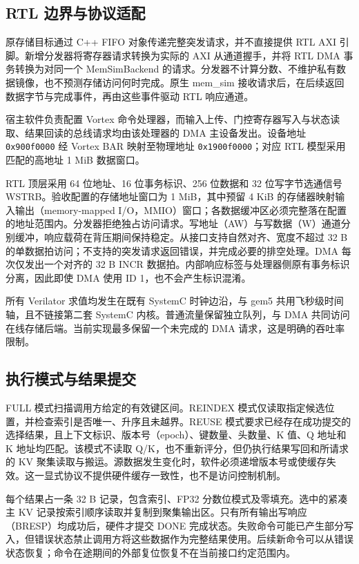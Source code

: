 \subsection{RTL 边界与协议适配}
原存储目标通过 C++ FIFO 对象传递完整突发请求，并不直接提供 RTL AXI 引脚。新增分发器将寄存器请求转换为实际的 AXI 从通道握手，并将 RTL DMA 事务转换为对同一个 MemSimBackend 的请求。分发器不计算分数、不维护私有数据镜像，也不预测存储访问何时完成。原生 mem\_sim 接收请求后，在后续返回数据字节与完成事件，再由这些事件驱动 RTL 响应通道。

宿主软件负责配置 Vortex 命令处理器，而输入上传、门控寄存器写入与状态读取、结果回读的总线请求均由该处理器的 DMA 主设备发出。设备地址 \texttt{0x900f0000} 经 Vortex BAR 映射至物理地址 \texttt{0x1900f0000}；对应 RTL 模型采用匹配的高地址 1 MiB 数据窗口。

RTL 顶层采用 64 位地址、16 位事务标识、256 位数据和 32 位写字节选通信号 WSTRB。验收配置的存储地址窗口为 1 MiB，其中预留 4 KiB 的存储器映射输入输出（memory-mapped I/O，MMIO）窗口；各数据缓冲区必须完整落在配置的地址范围内。分发器拒绝独占访问请求。写地址（AW）与写数据（W）通道分别缓冲，响应载荷在背压期间保持稳定。从接口支持自然对齐、宽度不超过 32 B 的单数据拍访问；不支持的突发请求返回错误，并完成必要的排空处理。DMA 每次仅发出一个对齐的 32 B INCR 数据拍。内部响应标签与处理器侧原有事务标识分离，因此即使 DMA 使用 ID 1，也不会产生标识混淆。

所有 Verilator 求值均发生在既有 SystemC 时钟边沿，与 gem5 共用飞秒级时间轴，且不链接第二套 SystemC 内核。普通流量保留独立队列，与 DMA 共同访问在线存储后端。当前实现最多保留一个未完成的 DMA 请求，这是明确的吞吐率限制。

\subsection{执行模式与结果提交}
FULL 模式扫描调用方给定的有效键区间。REINDEX 模式仅读取指定候选位置，并检查索引是否唯一、升序且未越界。REUSE 模式要求已经存在成功提交的选择结果，且上下文标识、版本号（epoch）、键数量、头数量、K 值、Q 地址和 K 地址均匹配。该模式不读取 Q/K，也不重新评分，但仍执行结果写回和所请求的 KV 聚集读取与搬运。源数据发生变化时，软件必须递增版本号或使缓存失效。这一显式协议不提供硬件缓存一致性，也不是访问控制机制。

每个结果占一条 32 B 记录，包含索引、FP32 分数位模式及零填充。选中的紧凑主 KV 记录按索引顺序读取并复制到聚集输出区。只有所有输出写响应（BRESP）均成功后，硬件才提交 DONE 完成状态。失败命令可能已产生部分写入，但错误状态禁止调用方将这些数据作为完整结果使用。后续新命令可以从错误状态恢复；命令在途期间的外部复位恢复不在当前接口约定范围内。


